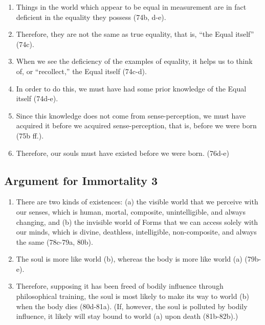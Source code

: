 \documentclass[oneside]{article}
\begin{document}
\begin{enumerate}
\def\labelenumi{\arabic{enumi}.}
\item
  Things in the world which appear to be equal in measurement are in
  fact deficient in the equality they possess (74b, d-e).
\item
  Therefore, they are not the same as true equality, that is, ``the
  Equal itself'' (74c).
\item
  When we see the deficiency of the examples of equality, it helps us to
  think of, or ``recollect,'' the Equal itself (74c-d).
\item
  In order to do this, we must have had some prior knowledge of the
  Equal itself (74d-e).
\item
  Since this knowledge does not come from sense-perception, we must have
  acquired it before we acquired sense-perception, that is, before we
  were born (75b ff.).
\item
  Therefore, our souls must have existed before we were born. (76d-e)
\end{enumerate}

\subsection*{Argument for Immortality
3}\label{argument-for-immortality-3}

\begin{enumerate}
\def\labelenumi{\arabic{enumi}.}
\item
  There are two kinds of existences: (a) the visible world that we
  perceive with our senses, which is human, mortal, composite,
  unintelligible, and always changing, and (b) the invisible world of
  Forms that we can access solely with our minds, which is divine,
  deathless, intelligible, non-composite, and always the same (78c-79a,
  80b).
\item
  The soul is more like world (b), whereas the body is more like world
  (a) (79b-e).
\item
  Therefore, supposing it has been freed of bodily influence through
  philosophical training, the soul is most likely to make its way to
  world (b) when the body dies (80d-81a). (If, however, the soul is
  polluted by bodily influence, it likely will stay bound to world (a)
  upon death (81b-82b).)
\end{enumerate}
\end{document}
